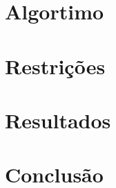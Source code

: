 \documentclass[12pt]{article}
\begin{document}
\section{Algortimo}


\section{Restrições}


\section{Resultados}\label{sec:figs}

\section{Conclusão}
\end{document}
